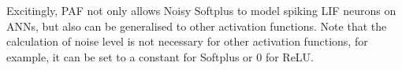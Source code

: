 \documentclass{article}
\begin{document}
	Excitingly, PAF not only allows Noisy Softplus to model spiking LIF neurons on ANNs, but also can be generalised to other activation functions.
	Note that the calculation of noise level is not necessary for other activation functions, for example, it can be set to a constant for Softplus or 0 for ReLU.
\end{document}
